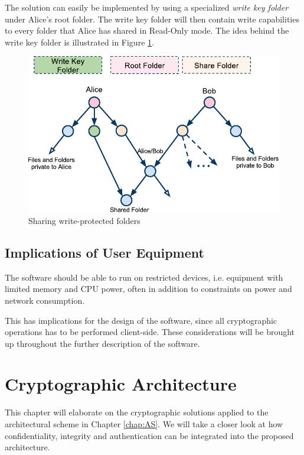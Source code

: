 \documentclass[pdftex,english,10pt,b5paper,twoside]{book}
\begin{document}
The solution can easily be implemented by using a specialized \emph{write key
folder} under Alice's root folder. The write key folder will then contain
write capabilities to every folder that Alice has shared in Read-Only mode.
The idea behind the write key folder is illustrated in Figure \ref{fig:AS:readonly}.

\begin{figure}[h!]
    \centering
    \includegraphics[width=\columnwidth]{ArchitectureShareReadOnlyFolder.pdf}
    \caption{Sharing write-protected folders}
    \label{fig:AS:readonly}
\end{figure}

\section{Implications of User Equipment}

The software should be able to run on restricted devices, i.e. equipment with
limited memory and \ac{CPU} power, often in addition to constraints on power and
network consumption.

This has implications for the design of the software, since all cryptographic
operations has to be performed client-side. These considerations will be
brought up throughout the further description of the software.

\chapter{Cryptographic Architecture}
\label{chap:CS}
This chapter will elaborate on the cryptographic solutions applied to the
architectural scheme in Chapter \ref{chap:AS}. We will take a closer look at
how confidentiality, integrity and authentication can be integrated into the
proposed architecture.
\end{document}

